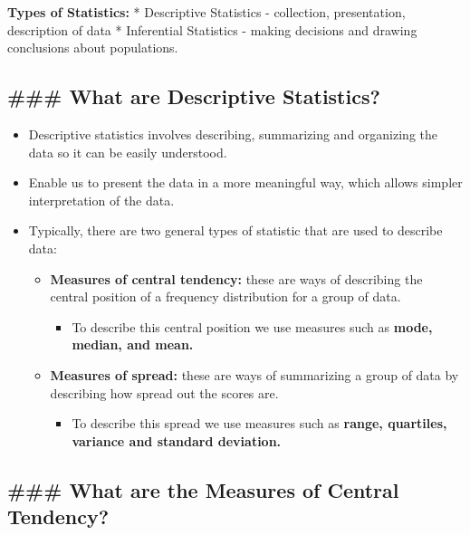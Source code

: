 \documentclass[11pt]{article}
\providecommand{\tightlist}{%
      \setlength{\itemsep}{0pt}\setlength{\parskip}{0pt}}
\begin{document}
    \textbf{Types of Statistics:} * Descriptive Statistics - collection,
presentation, description of data * Inferential Statistics - making
decisions and drawing conclusions about populations.

    \subsection{\#\#\# What are Descriptive
Statistics?}\label{what-are-descriptive-statistics}

    \begin{itemize}
\tightlist
\item
  Descriptive statistics involves describing, summarizing and organizing
  the data so it can be easily understood.
\item
  Enable us to present the data in a more meaningful way, which allows
  simpler interpretation of the data.
\item
  Typically, there are two general types of statistic that are used to
  describe data:

  \begin{itemize}
  \tightlist
  \item
    \textbf{Measures of central tendency:} these are ways of describing
    the central position of a frequency distribution for a group of
    data.

    \begin{itemize}
    \tightlist
    \item
      To describe this central position we use measures such as
      \textbf{mode, median, and mean.}
    \end{itemize}
  \item
    \textbf{Measures of spread:} these are ways of summarizing a group
    of data by describing how spread out the scores are.

    \begin{itemize}
    \tightlist
    \item
      To describe this spread we use measures such as \textbf{range,
      quartiles, variance and standard deviation.}
    \end{itemize}
  \end{itemize}
\end{itemize}

    \subsection{\#\#\# What are the Measures of Central
Tendency?}\label{what-are-the-measures-of-central-tendency}
\end{document}
